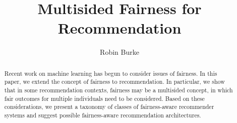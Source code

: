 \documentclass[sigconf, 11pt]{acmart}
\begin{document}
\title{Multisided Fairness for Recommendation}

\author{Robin Burke}

\begin{abstract}
Recent work on machine learning has begun to consider issues of fairness. In this paper, we extend the concept of fairness to recommendation. In particular, we show that in some recommendation contexts, fairness may be a multisided concept, in which fair outcomes for multiple individuals need to be considered. Based on these considerations, we present a taxonomy of classes of fairness-aware recommender systems and suggest possible fairness-aware recommendation architectures.
\end{abstract}


\maketitle




 
\end{document}
